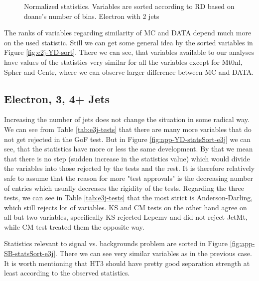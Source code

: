 \begin{figure}[h]
\quad
    \caption{Normalized statistics. Variables are sorted according to RD based on doane's number of bins. Electron with 2 jets}
    \label{fig:e2j-statsSort}
\end{figure}

The ranks of variables regarding similarity of MC and DATA depend much more on the used statistic. Still we can get some general idea by the  sorted variables in Figure  \ref{fig:e2j-YD-sort}. There we can see, that variables available to our analyses have values of the statistics very similar for all the variables except for \textsf{Mt0nl, Spher} and \textsf{Centr}, where we can observe larger difference between MC and DATA. 

\subsection{Electron, 3, 4+ Jets}

Increasing the number of jets does not change the situation in some radical way. We can see from Table \ref{tab:e3j-tests} that there are many more variables that do not get rejected in the GoF test. But in Figure \ref{fig:app-YD-statsSort-e3j} we can see, that the statistics have more or less the same development. By that  we mean that there is no step (sudden increase in the statistics value) which would divide the variables into those rejected by the tests and the rest. It is therefore relatively safe to assume that the reason for more "test approvals" is the decreasing number of entries which usually decreases the rigidity of the tests. Regarding the three tests, we can see in Table \ref{tab:e3j-tests} that the most strict is Anderson-Darling, which still rejects lot of variables. KS and CM tests on the other hand agree on all but two variables, specifically KS rejected \textsf{Lepemv} and did not reject \textsf{JetMt}, while CM  test treated them the opposite way. 

Statistics relevant to signal vs. backgrounds problem are sorted in Figure \ref{fig:app-SB-statsSort-e3j}. There we can see very similar variables as in the previous case. It is worth mentioning that \textsf{HT3} should have  pretty good separation strength at least according to the observed statistics. 

